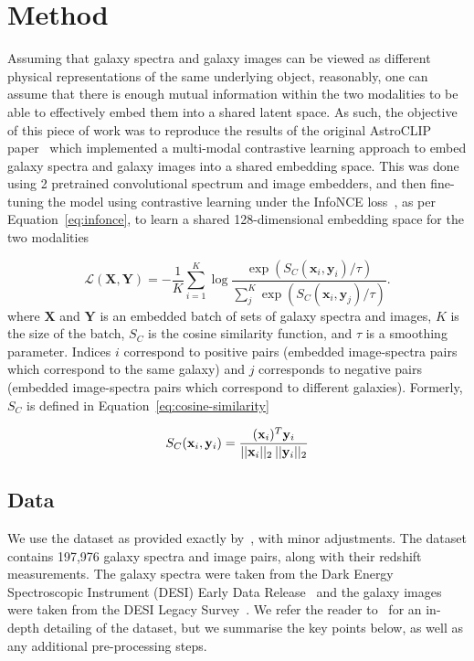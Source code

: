 
\section{Method}\label{sec:method}
Assuming that galaxy spectra and galaxy images can be viewed as different physical representations of the same underlying
object, reasonably, one can assume that there is enough mutual information within the two modalities to be able to effectively
embed them into a shared latent space.
As such, the objective of this piece of work was to reproduce the results of the original AstroCLIP paper~\citep{astroclip}
which implemented a multi-modal contrastive learning approach to embed galaxy spectra and galaxy images into a shared embedding
space.
This was done using 2 pretrained convolutional spectrum and image embedders, and then fine-tuning the model using contrastive
learning under the InfoNCE loss~\citep{oord2019}, as per Equation~\eqref{eq:infonce}, to learn a shared 128-dimensional
embedding space for the two modalities

\begin{equation}
\label{eq:infonce}
    \mathcal{L}(\mathbf{X}, \mathbf{Y}) = - \frac{1}{K} \sum_{i=1}^K \log \frac{\exp(S_C(\mathbf{x}_i, \mathbf{y}_i) / \tau)}{\sum_{j}^K \exp(S_C(\mathbf{x}_i, \mathbf{y}_j) / \tau)}.
\end{equation}
where $\mathbf{X}$ and $\mathbf{Y}$ is an embedded batch of sets of galaxy spectra and images, $K$ is the size of the
batch, $S_C$ is the cosine similarity function, and $\tau$ is a smoothing parameter.
Indices $i$ correspond to positive pairs (embedded image-spectra pairs which correspond to the same galaxy) and $j$ corresponds
to negative pairs (embedded image-spectra pairs which correspond to different galaxies).
Formerly, $S_C$ is defined in Equation~\eqref{eq:cosine-similarity}

\begin{equation}
\label{eq:cosine-similarity}
    S_C(\mathbf{x}_i, \mathbf{y}_i) = \frac{(\mathbf{x}_i)^{T} \mathbf{y}_i}{ ||\mathbf{x}_i||_{2} \hspace{0.2em} ||\mathbf{y}_i||_{2}}
\end{equation}

\subsection{Data}\label{subsec:data}
We use the dataset as provided exactly by~\cite{astroclip}, with minor adjustments.
The dataset contains 197,976 galaxy spectra and image pairs, along with their redshift measurements.
The galaxy spectra were taken from the Dark Energy Spectroscopic Instrument (DESI) Early Data Release~\citep{desiearly2023}
and the galaxy images were taken from the DESI Legacy Survey~\citep{desilegacy2023}.
We refer the reader to~\cite{astroclip} for an in-depth detailing of the dataset, but we summarise the key points below,
as well as any additional pre-processing steps.

